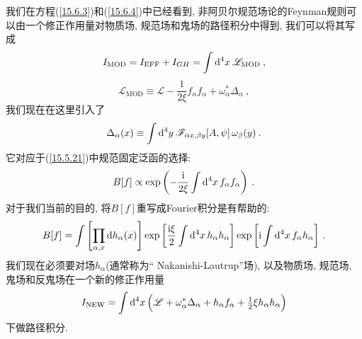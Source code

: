 我们在方程(\ref{15.6.3})和(\ref{15.6.4})中已经看到, 非阿贝尔规范场论的Feynman规则可以由一个修正作用量对物质场, 规范场和鬼场的路径积分中得到, 我们可以将其写成\begin{equation}
I_{\mathrm{MOD}}=I_{\mathrm{EFF}}+I_{GH}=\int \dif^{4}x\:\mathscr{L}_{\mathrm{MOD}}%
\:,   \label{15.7.1}
\end{equation}%
\begin{equation}
\mathscr{L}_{\mathrm{MOD}}\equiv \mathscr{L}-\frac{1}{2\xi }f_{\alpha
}f_{\alpha }+\omega _{\alpha }^{\ast }\Delta _{\alpha }\:, 
\label{15.7.2}
\end{equation}%
我们现在在这里引入了
\begin{equation}
\Delta _{\alpha }(x)\equiv \int \mathrm{d}^{4}y\:\mathscr{F}_{\alpha x,\beta y}[A,\psi
]\,\omega _{\beta }(y)\:.   \label{15.7.3}
\end{equation}%
它对应于(\ref{15.5.21})中规范固定泛函的选择:%
\begin{equation}
B[f]\propto \exp \left( -\frac{\mathrm{i}}{2\xi }\int \mathrm{d}^{4}x\,f_{\alpha }f_{\alpha
}\right) \:.   \label{15.7.4}
\end{equation}%
对于我们当前的目的, 将$B[f]$重写成Fourier积分是有帮助的:%
\begin{equation}
B[f]=\int \left[ \prod_{\alpha ,x}\dif h_{\alpha }(x)\right] \exp \left[ \frac{%
\mi\xi }{2}\int \dif^{4}x\,h_{\alpha }h_{\alpha }\right] \exp \left[ \mi\int
\dif^{4}x\,f_{\alpha }h_{\alpha }\right] \:.   \label{15.7.5}
\end{equation}%
我们现在必须要对场$h_{\alpha }$(通常称为\textquotedblleft
Nakanishi-Lautrup''场\cite{11a}), 以及物质场, 规范场, 鬼场和反鬼场在一个新的修正作用量
\begin{equation}
I_{\text{NEW}}=\int \mathrm{d}^{4}x\,\Big( \mathscr{L}+\omega _{\alpha }^{\ast }\Delta
_{\alpha }+h_{\alpha }f_{\alpha }+\tfrac{1}{2}\xi h_{\alpha }h_{\alpha
}\Big)   \label{15.7.6}
\end{equation}
下做路径积分.


